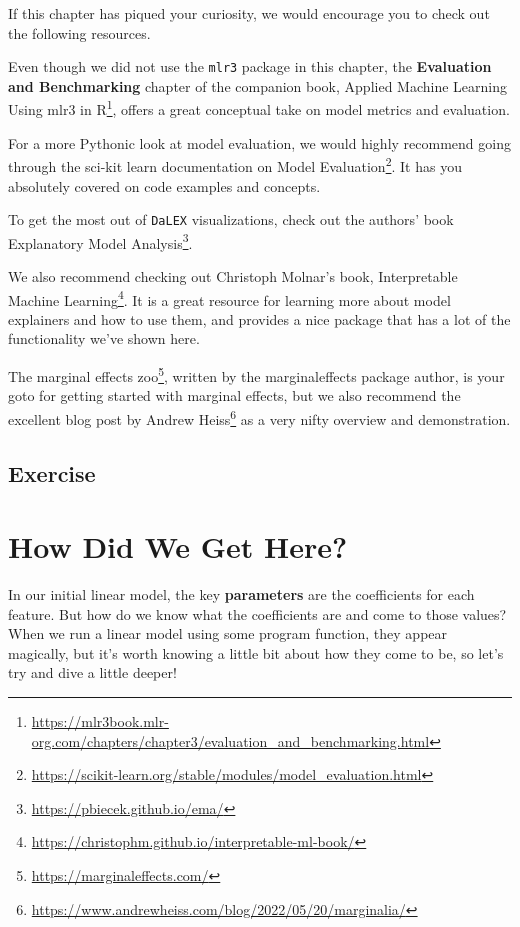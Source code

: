 \documentclass[
  letterpaper,
]{krantz}
\DeclareRobustCommand{\href}[2]{#2\footnote{\url{#1}}}
\begin{document}
If this chapter has piqued your curiosity, we would encourage you to
check out the following resources.

Even though we did not use the \texttt{mlr3} package in this chapter,
the \textbf{Evaluation and Benchmarking} chapter of the companion book,
\href{https://mlr3book.mlr-org.com/chapters/chapter3/evaluation_and_benchmarking.html}{Applied
Machine Learning Using mlr3 in R}, offers a great conceptual take on
model metrics and evaluation.

For a more Pythonic look at model evaluation, we would highly recommend
going through the sci-kit learn documentation on
\href{https://scikit-learn.org/stable/modules/model_evaluation.html}{Model
Evaluation}. It has you absolutely covered on code examples and
concepts.

To get the most out of \texttt{DaLEX} visualizations, check out the
authors' book \href{https://pbiecek.github.io/ema/}{Explanatory Model
Analysis}.

We also recommend checking out Christoph Molnar's book,
\href{https://christophm.github.io/interpretable-ml-book/}{Interpretable
Machine Learning}. It is a great resource for learning more about model
explainers and how to use them, and provides a nice package that has a
lot of the functionality we've shown here.

The \href{https://marginaleffects.com/}{marginal effects zoo}, written
by the {marginaleffects} package author, is your goto for getting
started with marginal effects, but we also recommend the
\href{https://www.andrewheiss.com/blog/2022/05/20/marginalia/}{excellent
blog post by Andrew Heiss} as a very nifty overview and demonstration.

\section{Exercise}\label{exercise}

\chapter{How Did We Get Here?}\label{sec-estimation}

In our initial linear model, the key \textbf{parameters} are the
coefficients for each feature. But how do we know what the coefficients
are and come to those values? When we run a linear model using some
program function, they appear magically, but it's worth knowing a little
bit about how they come to be, so let's try and dive a little deeper!
\end{document}
